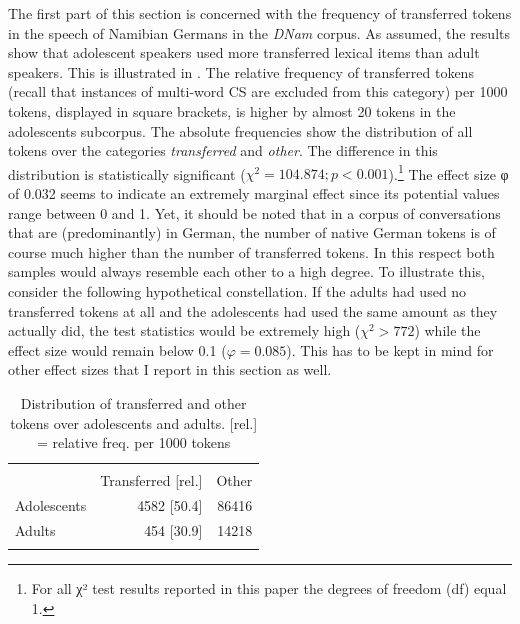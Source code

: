 \documentclass[output=paper]{langsci/langscibook}
\begin{document}
The first part of this section is concerned with the frequency of transferred tokens in the speech of Namibian Germans in the \textit{DNam} corpus. As assumed, the results show that adolescent speakers used more transferred lexical items than adult speakers. This is illustrated in . The relative frequency of transferred tokens (recall that instances of multi-word CS are excluded from this category) per 1000 tokens, displayed in square brackets, is higher by almost 20 tokens in the adolescents subcorpus. The absolute frequencies show the distribution of all tokens over the categories \textit{transferred} and \textit{other}. The difference in this distribution is statistically significant ($\chi^2 = 104.874; p < 0.001$).\footnote{For all χ² test results reported in this paper the degrees of freedom (df) equal 1.} The effect size φ of 0.032 seems to indicate an extremely marginal effect since its potential values range between 0 and 1. Yet, it should be noted that in a corpus of conversations that are (predominantly) in German, the number of native German tokens is of course much higher than the number of transferred tokens. In this respect both samples would always resemble each other to a high degree. To illustrate this, consider the following hypothetical constellation. If the adults had used no transferred tokens at all and the adolescents had used the same amount as they actually did, the test statistics would be extremely high ($\chi^2 > 772$) while the effect size would remain below 0.1 ($\varphi = 0.085$). This has to be kept in mind for other effect sizes that I report in this section as well.

  
\begin{table}
\begin{tabular}{lrr} 
\lsptoprule
\multicolumn{2}{c}{Tokens}\\\cmidrule(lr){2-3}
& Transferred [rel.] & Other\\
\midrule
Adolescents & 4582 [50.4] & 86416\\
Adults & 454 [30.9] & 14218\\
\lspbottomrule
\end{tabular}
\caption{Distribution of transferred and other tokens over adolescents and adults. {[}rel.{]} = relative freq. per 1000 tokens\label{tab:bracke:3}}
\end{table}  
\end{document}
